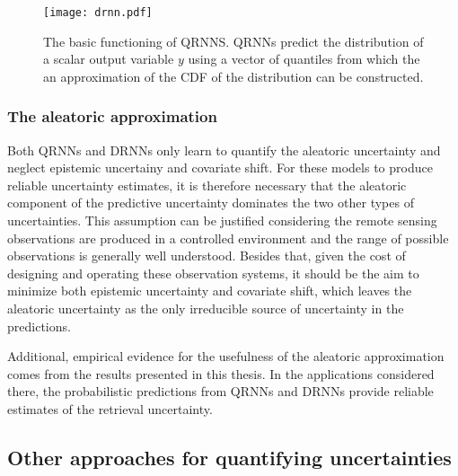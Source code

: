 \begin{description}
\begin{figure}[btp]
  \centering
  \texttt{[image: drnn.pdf]}
  \caption{The basic functioning of QRNNS. QRNNs predict the distribution of
    a scalar output variable $y$ using a vector of quantiles from which the
    an approximation of the CDF of the distribution can be constructed.}
  \label{fig:machine_learning:drnn}
\end{figure}

\subsubsection{The aleatoric approximation}

Both QRNNs and DRNNs only learn to quantify the aleatoric uncertainty and
neglect epistemic uncertainy and covariate shift. For these models to produce
reliable uncertainty estimates, it is therefore necessary that the aleatoric
component of the predictive uncertainty dominates the two other types of
uncertainties. This assumption can be justified considering the remote sensing
observations are produced in a controlled environment and the range of possible
observations is generally well understood. Besides that, given the cost of
designing and operating these observation systems, it should be the aim to
minimize both epistemic uncertainty and covariate shift, which leaves the
aleatoric uncertainty as the only irreducible source of uncertainty in the
predictions.

Additional, empirical evidence for the usefulness of the aleatoric approximation
comes from the results presented in this thesis. In the applications considered
there, the probabilistic predictions from QRNNs and DRNNs provide reliable
estimates of the retrieval uncertainty.

%

\subsection{Other approaches for quantifying uncertainties}


\end{description}
